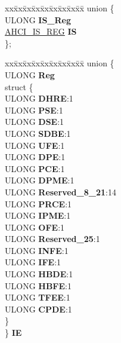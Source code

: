 \begin{DoxyCompactItemize}
\begin{tabbing}
\end{tabbing}\item 
\mbox{\label{struct___i_d_e___a_h_c_i___p_o_r_t___r_e_g_i_s_t_e_r_s_a57c2e8dad1a859e3a64f0433867e6032}} 
\begin{tabbing}
xx\=xx\=xx\=xx\=xx\=xx\=xx\=xx\=xx\=\kill
union \{\\
\>ULONG {\bfseries IS\_Reg}\\
\>\hyperlink{union___a_h_c_i___i_s___r_e_g}{AHCI\_IS\_REG} {\bfseries IS}\\
\}; \\

\end{tabbing}\item 
\mbox{\label{struct___i_d_e___a_h_c_i___p_o_r_t___r_e_g_i_s_t_e_r_s_a23775d3ecb6037c2fc6e3ef4e16c0af4}} 
\begin{tabbing}
xx\=xx\=xx\=xx\=xx\=xx\=xx\=xx\=xx\=\kill
union \{\\
\>ULONG {\bfseries Reg}\\
\mbox{\label{union___i_d_e___a_h_c_i___p_o_r_t___r_e_g_i_s_t_e_r_s_1_1_0D1017_a61ded8eea95ab8423ad66c572e60a20c}} 
\>struct \{\\
\>\>ULONG {\bfseries DHRE}:1\\
\>\>ULONG {\bfseries PSE}:1\\
\>\>ULONG {\bfseries DSE}:1\\
\>\>ULONG {\bfseries SDBE}:1\\
\>\>ULONG {\bfseries UFE}:1\\
\>\>ULONG {\bfseries DPE}:1\\
\>\>ULONG {\bfseries PCE}:1\\
\>\>ULONG {\bfseries DPME}:1\\
\>\>ULONG {\bfseries Reserved\_8\_21}:14\\
\>\>ULONG {\bfseries PRCE}:1\\
\>\>ULONG {\bfseries IPME}:1\\
\>\>ULONG {\bfseries OFE}:1\\
\>\>ULONG {\bfseries Reserved\_25}:1\\
\>\>ULONG {\bfseries INFE}:1\\
\>\>ULONG {\bfseries IFE}:1\\
\>\>ULONG {\bfseries HBDE}:1\\
\>\>ULONG {\bfseries HBFE}:1\\
\>\>ULONG {\bfseries TFEE}:1\\
\>\>ULONG {\bfseries CPDE}:1\\
\>\} \\
\} {\bfseries IE}\\


\end{tabbing}
\end{DoxyCompactItemize}
